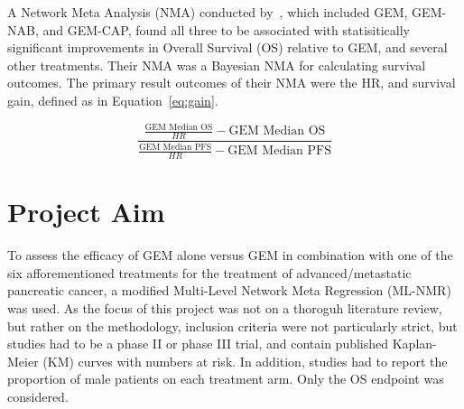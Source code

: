 A Network Meta Analysis (NMA) conducted by~\cite{gresham2014}, which included GEM, GEM-NAB, and GEM-CAP, found all three to be associated with statisitically significant improvements in Overall Survival (OS) relative to GEM, and several other treatments. Their NMA was a Bayesian NMA for calculating survival outcomes. The primary result outcomes of their NMA were the HR, and survival gain, defined as in Equation~\ref{eq:gain}. 

\begin{equation}
    \frac{\frac{\text{GEM Median OS}}{HR}-\text{GEM Median OS}}{\frac{\text{GEM Median PFS}}{HR}-\text{GEM Median PFS}}
    \label{eq:gain}
\end{equation}

\section{Project Aim}
To assess the efficacy of GEM alone versus GEM in combination with one of the six afforementioned treatments for the treatment of advanced/metastatic pancreatic cancer, a modified Multi-Level Network Meta Regression (ML-NMR) was used. As the focus of this project was not on a thoroguh literature review, but rather on the methodology, inclusion criteria were not particularly strict, but studies had to be a phase II or phase III trial, and contain published Kaplan-Meier (KM) curves with numbers at risk. In addition, studies had to report the proportion of male patients on each treatment arm. Only the OS endpoint was considered. 

